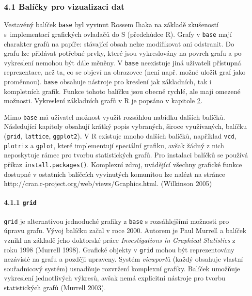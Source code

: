 \documentclass[12pt,]{article}
\let\oldparagraph\paragraph
\renewcommand{\paragraph}[1]{\oldparagraph{#1}\mbox{}}
\begin{document}
\hypertarget{baseviz}{\subsubsection{4.1 Balíčky pro vizualizaci
dat}\label{baseviz}}

\qquad Vestavěný balíček \texttt{base} byl vyvinut Rossem Ihaka na
základě zkušeností s~implementací grafických ovladačů do S (předchůdce
R). Grafy v \texttt{base} mají charakter grafů na papíře: stávající
obsah nelze modifikovat ani odstranit. Do grafu lze přidávat potřebné
prvky, které jsou vykreslovány na povrch grafu a po vykreslení nemohou
být dále měněny. V \texttt{base} neexistuje jiná uživateli přístupná
reprezentace, než ta, co se objeví na obrazovce (není např. možné uložit
graf jako proměnnou). \texttt{base} obsahuje nástroje pro kreslení jak
základních, tak i kompletních grafik. Funkce tohoto balíčku jsou obecně
rychlé, ale mají omezené možnosti. Vykreslení základních grafů v R je
popsáno v kapitole \protect\hyperlink{base}{2}.

\qquad Mimo \texttt{base} má uživatel možnost využít rozsáhlou nabídku
dalších balíčků. Následující kapitoly obsahují krátký popis vybraných,
široce využívaných, balíčku (\texttt{grid}, \texttt{lattice},
\texttt{ggplot2}). V R existuje mnoho dalších balíčků, například
\texttt{vcd}, \texttt{plotrix} a \texttt{gplot}, které implementují
speciální grafiku, avšak žádný z nich neposkytuje rámec pro tvorbu
statistických grafů. Pro instalaci balíčků se používá příkaz
\texttt{install.packages()}. Komplexní zdroj, uvádějící všechny grafické
funkce dostupné v ostatních balíčcích vyvinutých komunitou lze nalézt na
stránce \mbox{http://cran.r-project.org/web/views/Graphics.html}.
(Wilkinson 2005)

\paragraph{\texorpdfstring{4.1.1 \texttt{grid}}{4.1.1 grid}}\label{grid}

\qquad \texttt{grid} je alternativou jednoduché grafiky z \texttt{base}
s rozsáhlejšími možnosti pro úpravu grafu. Vývoj balíčku začal v roce
2000. Autorem je Paul Murrell a balíček vznikl na základě jeho doktorské
práce \emph{Investigations in Graphical Statistics} z roku 1998 (Murrell
1998). Grafické objekty v \texttt{grid} mohou být reprezentovány
nezávislé na grafu a později upraveny. Systém \emph{viewport}ů (každý
obsahuje vlastní souřadnicový systém) usnadňuje rozvržení komplexní
grafiky. Balíček umožňuje vykreslení jednotlivých výkresů, avšak nemá
explicitní nástroje pro tvorbu statistických grafů (Murrell 2003).
\end{document}
